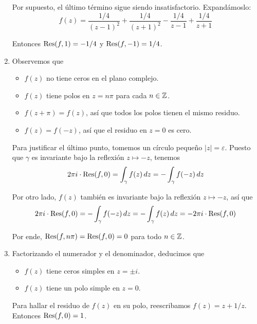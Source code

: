 \begin{solution}
\begin{enumerate}[label=(\alph*)]
    Por supuesto, el último término sigue siendo insatisfactorio. Expandámoslo:
    $$f(z) = \frac {1/4} {(z - 1)^2} + \frac {1/4} {(z + 1)^2} - \frac {1/4} {z - 1} + \frac {1/4} {z + 1}$$
    
    Entonces $\operatorname{Res}(f, 1) = -1/4$ y $\operatorname{Res}(f, -1) = 1/4$.
    
    \item Observemos que
    \begin{itemize}
        \item $f(z)$ no tiene ceros en el plano complejo.
        \item $f(z)$ tiene polos en $z = n\pi$ para cada $n \in \mathbb Z$.
        \item $f(z + \pi) = f(z)$, así que todos los polos tienen el mismo residuo.
        \item $f(z) = f(-z)$, así que el residuo en $z = 0$ es cero.
    \end{itemize}
    
    Para justificar el último punto, tomemos un círculo pequeño $|z| = \varepsilon$. Puesto que $\gamma$ es invariante bajo la reflexión $z \mapsto -z$, tenemos
    $$2\pi i \cdot \operatorname{Res}(f, 0) = \int_\gamma f(z) \, dz = -\int_\gamma f(-z) \, dz$$
    
    Por otro lado, $f(z)$ también es invariante bajo la reflexión $z \mapsto -z$, así que
    $$2\pi i \cdot \operatorname{Res}(f, 0) = -\int_\gamma f(-z) \, dz = -\int_\gamma f(z) \, dz = -2\pi i \cdot \operatorname{Res}(f, 0)$$
    
    Por ende, $\operatorname{Res}(f, n\pi) = \operatorname{Res}(f, 0) = 0$ para todo $n \in \mathbb Z$.
    
    \item Factorizando el numerador y el denominador, deducimos que
    \begin{itemize}
        \item $f(z)$ tiene ceros simples en $z = \pm i$.
        \item $f(z)$ tiene un polo simple en $z = 0$.
    \end{itemize}
    
    Para hallar el residuo de $f(z)$ en su polo, reescribamos $f(z) = z + 1/z$. Entonces $\operatorname{Res}(f, 0) = 1$.
\end{enumerate}
\end{solution}
